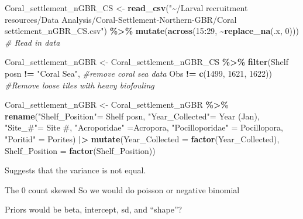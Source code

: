 \documentclass[
]{article}
\newenvironment{Shaded}{\begin{snugshade}}{\end{snugshade}}
\newcommand{\AttributeTok}[1]{\textcolor[rgb]{0.13,0.29,0.53}{#1}}
\newcommand{\CommentTok}[1]{\textcolor[rgb]{0.56,0.35,0.01}{\textit{#1}}}
\newcommand{\DecValTok}[1]{\textcolor[rgb]{0.00,0.00,0.81}{#1}}
\newcommand{\FunctionTok}[1]{\textcolor[rgb]{0.13,0.29,0.53}{\textbf{#1}}}
\newcommand{\NormalTok}[1]{#1}
\newcommand{\OtherTok}[1]{\textcolor[rgb]{0.56,0.35,0.01}{#1}}
\newcommand{\SpecialCharTok}[1]{\textcolor[rgb]{0.81,0.36,0.00}{\textbf{#1}}}
\newcommand{\StringTok}[1]{\textcolor[rgb]{0.31,0.60,0.02}{#1}}
\begin{document}
\begin{Shaded}
\begin{Highlighting}[]
\NormalTok{Coral\_settlement\_nGBR\_CS }\OtherTok{\textless{}{-}} \FunctionTok{read\_csv}\NormalTok{(}\StringTok{"\textasciitilde{}/Larval recruitment resources/Data Analysis/Coral{-}Settlement{-}Northern{-}GBR/Coral settlement\_nGBR\_CS.csv"}\NormalTok{) }\SpecialCharTok{\%\textgreater{}\%}
  \FunctionTok{mutate}\NormalTok{(}\FunctionTok{across}\NormalTok{(}\DecValTok{15}\SpecialCharTok{:}\DecValTok{29}\NormalTok{, }\SpecialCharTok{\textasciitilde{}}\FunctionTok{replace\_na}\NormalTok{(.x, }\DecValTok{0}\NormalTok{))) }\CommentTok{\# Read in data}

\NormalTok{Coral\_settlement\_nGBR }\OtherTok{\textless{}{-}}\NormalTok{ Coral\_settlement\_nGBR\_CS }\SpecialCharTok{\%\textgreater{}\%} 
  \FunctionTok{filter}\NormalTok{(}\StringTok{\textasciigrave{}}\AttributeTok{Shelf posn}\StringTok{\textasciigrave{}} \SpecialCharTok{!=} \StringTok{"Coral Sea"}\NormalTok{, }\CommentTok{\#remove coral sea data}
\NormalTok{        Obs }\SpecialCharTok{!=} \FunctionTok{c}\NormalTok{(}\DecValTok{1499}\NormalTok{, }\DecValTok{1621}\NormalTok{, }\DecValTok{1622}\NormalTok{)) }\CommentTok{\#Remove loose tiles with heavy biofouling}

\NormalTok{Coral\_settlement\_nGBR }\OtherTok{\textless{}{-}}\NormalTok{ Coral\_settlement\_nGBR }\SpecialCharTok{\%\textgreater{}\%} 
  \FunctionTok{rename}\NormalTok{(}\StringTok{"Shelf\_Position"}\OtherTok{=} \StringTok{\textasciigrave{}}\AttributeTok{Shelf posn}\StringTok{\textasciigrave{}}\NormalTok{,}
         \StringTok{"Year\_Collected"}\OtherTok{=} \StringTok{\textasciigrave{}}\AttributeTok{Year (Jan)}\StringTok{\textasciigrave{}}\NormalTok{,}
         \StringTok{"Site\_\#"}\OtherTok{=} \StringTok{\textasciigrave{}}\AttributeTok{Site \#}\StringTok{\textasciigrave{}}\NormalTok{,}
         \StringTok{"Acroporidae"} \OtherTok{=}\NormalTok{Acropora,}
         \StringTok{"Pocilloporidae"} \OtherTok{=}\NormalTok{ Pocillopora,}
         \StringTok{"Poritid"} \OtherTok{=}\NormalTok{ Porites) }\SpecialCharTok{|\textgreater{}} 
  \FunctionTok{mutate}\NormalTok{(}\AttributeTok{Year\_Collected =} \FunctionTok{factor}\NormalTok{(Year\_Collected),}
         \AttributeTok{Shelf\_Position =} \FunctionTok{factor}\NormalTok{(Shelf\_Position))}
\end{Highlighting}
\end{Shaded}

Suggests that the variance is not equal.

The 0 count skewed So we would do poisson or negative binomial

Priors would be beta, intercept, sd, and ``shape''?
\end{document}
